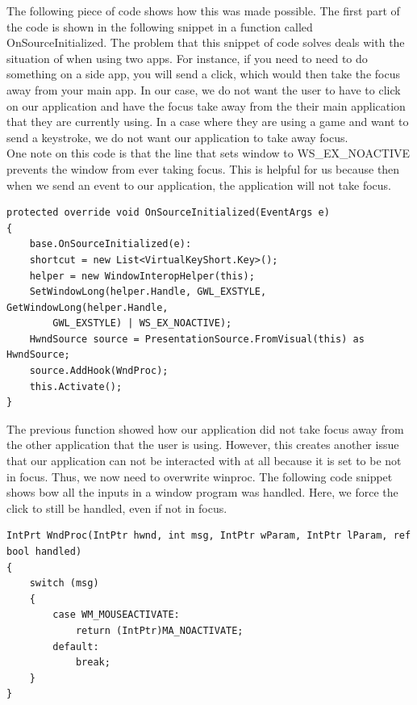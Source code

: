 \documentclass[fullpage, 10pt, onecolumn, draftclsnofoot]{IEEEtran}
\begin{document}
\indent The following piece of code shows how this was made possible. The first part of the code is shown in the following snippet in a function called OnSourceInitialized. The problem that this snippet of code solves deals with the situation of when using two apps. For instance, if you need to need to do something on a side app, you will send a click, which would then take the focus away from your main app. In our case, we do not want the user to have to click on our application and have the focus take away from the their main application that they are currently using. In a case where they are using a game and want to send a keystroke, we do not want our application to take away focus.  \\
\newline
\indent One note on this code is that the line that sets window to WS\_EX\_NOACTIVE prevents the window from ever taking focus. This is helpful for us because then when we send an event to our application, the application will not take focus. \\
\newline
\lstset{style=sharpc}
\begin{lstlisting}
protected override void OnSourceInitialized(EventArgs e)
{
    base.OnSourceInitialized(e):
    shortcut = new List<VirtualKeyShort.Key>();
    helper = new WindowInteropHelper(this);
    SetWindowLong(helper.Handle, GWL_EXSTYLE, GetWindowLong(helper.Handle, 
        GWL_EXSTYLE) | WS_EX_NOACTIVE);
    HwndSource source = PresentationSource.FromVisual(this) as HwndSource;
    source.AddHook(WndProc);
    this.Activate();
}

\end{lstlisting} 

\noindent The previous function showed how our application did not take focus away from the other application that the user is using. However, this creates another issue that our application can not be interacted with at all because it is set to be not in focus. Thus, we now need to overwrite winproc. The following code snippet shows bow all the inputs in a window program was handled. Here, we force the click to still be handled, even if not in focus.
\lstset{style=sharpc}
\begin{lstlisting}
IntPrt WndProc(IntPtr hwnd, int msg, IntPtr wParam, IntPtr lParam, ref bool handled)
{
    switch (msg) 
    {
        case WM_MOUSEACTIVATE:
            return (IntPtr)MA_NOACTIVATE;
        default: 
            break;
    }
}
\end{lstlisting}
\end{document}
